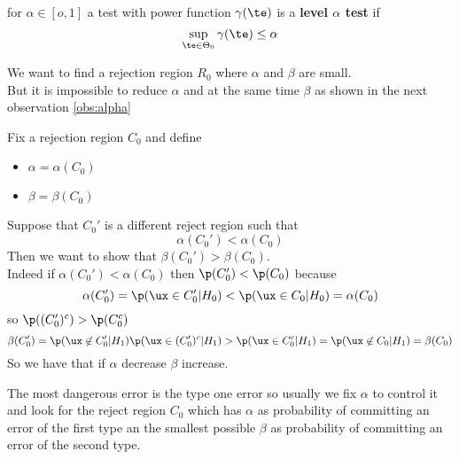 \begin{defi}
	for $\alpha \in [o,1]$ a test with power function $\gamma(\te)$ is a \textbf{level $\alpha$ test} if 
	$$\sup_{\te \in \Theta_0}\gamma(\te)\leq \alpha$$
\end{defi}
We want to find a rejection region $R_0$ where $\alpha$ and $\beta$ are small.\\
But it is impossible to reduce $\alpha$ and at the same time $\beta$ as shown in the next observation \ref{obs:alpha}
\begin{oss}\label{obs:alpha}
	Fix a rejection region $C_0$  and define 
	\begin{itemize}
		\item$\alpha=\alpha(C_0)$
		\item$\beta=\beta(C_0)$
	\end{itemize}
Suppose that $C_0'$ is a different reject  region such that
$$\alpha(C_0')<\alpha(C_0)$$
Then we want to show that $\beta(C_0')>\beta(C_0)$.\\
Indeed if $\alpha(C_0')<\alpha(C_0)$ then $\p(C_0')<\p(C_0)$ because 
$$\alpha (C_0')=\p(\ux \in C_0'|H_0)< \p(\ux \in C_0|H_0)=\alpha(C_0)$$
so $\p((C_0')^c)>\p(C_0^c)$
$$\beta (C_0')=\p(\ux \not \in C_0'|H_1)\p(\ux \in (C_0')^c|H_1 )> \p(\ux \in C_0^c|H_1)= \p(\ux \not \in C_0|H_1)=\beta(C_0)$$
So we have that if $\alpha$ decrease $\beta$ increase.
\end{oss}
The most dangerous error is the type one error so usually we fix $\alpha$ to control it and look for the reject region $C_0$ which has $\alpha$ as probability of committing an error of the first type an the smallest possible $\beta$ as probability of committing an error of the second type.\\
